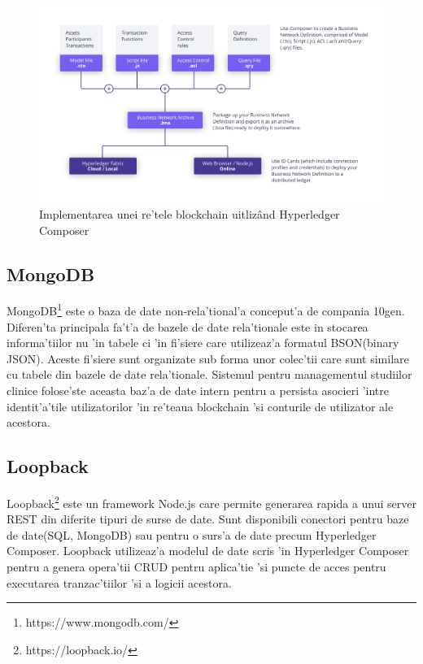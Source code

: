 \documentclass[12pt,a4paper,twoside]{report}
\begin{document}
		\begin{figure}[H]
		\begin{center}
			\includegraphics[scale=0.60]{img/composer.png}
			\caption{Implementarea unei re'tele blockchain uitliz\^and Hyperledger Composer}
  			\label{fig:comp}
  		\end{center}
  		\end{figure}
  		
\subsection{MongoDB}
MongoDB\footnote{https://www.mongodb.com/} este o baza de date non-rela'tional'a conceput'a de compania 10gen. Diferen'ta principala fa't'a de bazele de date rela'tionale este in stocarea informa'tiilor nu 'in tabele ci 'in fi'siere care utilizeaz'a formatul BSON(binary JSON). Aceste fi'siere sunt organizate sub forma unor colec'tii care sunt similare cu tabele din bazele de date rela'tionale. Sistemul pentru managementul studiilor clinice folose'ste aceasta baz'a de date intern
pentru a persista asocieri 'intre identit'a'tile utilizatorilor 'in re'teaua blockchain 'si conturile de utilizator ale acestora.

\subsection{Loopback}
Loopback\footnote{https://loopback.io/} este un framework Node.js care permite generarea rapida a unui server REST din diferite tipuri de surse de date. Sunt disponibili conectori pentru baze de date(SQL, MongoDB) sau pentru o surs'a de date precum Hyperledger Composer. Loopback utilizeaz'a modelul de date scris 'in Hyperledger Composer pentru a genera opera'tii CRUD pentru aplica'tie 'si puncte de acces pentru executarea tranzac'tiilor 'si a logicii acestora.
\end{document}
